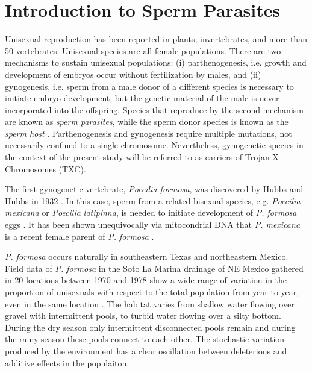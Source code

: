	\section{Introduction to Sperm Parasites}
	Unisexual reproduction has been reported in plants, invertebrates, and more than 50 vertebrates. Unisexual species are all-female populations. There are two mechanisms to sustain unisexual populations: (i) parthenogenesis, i.e. growth and development of embryos occur without fertilization by males, and (ii) gynogenesis, i.e. sperm from a male donor of a different species is necessary to initiate embryo development, but the genetic material of the male is never incorporated into the offspring. Species that reproduce by the second mechanism are known as \textit{sperm parasites}, while the sperm donor species is known as the \textit{sperm host} \cite{Kokko:persist}. Parthenogenesis and gynogenesis require multiple mutations, not necessarily confined to a single chromosome. Nevertheless, gynogenetic species in the context of the present study will be referred to as carriers of Trojan X Chromosomes (TXC). 
	
	The first gynogenetic vertebrate, \textit{Poecilia formosa}, was discovered by Hubbs and Hubbs in 1932 \cite{Wetherington:Poeciliopsis}. In this case, sperm from a related bisexual species, e.g. \textit{Poecilia mexicana} or \textit{Poecilia latipinna}, is needed to initiate development of \textit{P. formosa} eggs \cite{Balsano:Poecilia}.  It has been shown unequivocally via mitocondrial DNA that \textit{P. mexicana} is a recent female parent of \textit{P. formosa} \cite{Avise:Formosa}.    
	
	\textit{P. formosa} occurs naturally in southeastern Texas and northeastern Mexico. Field data of \textit{P. formosa} in the Soto La Marina drainage of NE Mexico gathered in 20 locations between 1970 and 1978 show a wide range of variation in the proportion of unisexuals with respect to the total population from year to year, even in the same location \cite{Balsano:Poecilia}.  The habitat varies from shallow water flowing over gravel with intermittent pools,  to turbid water flowing over a silty bottom. During the dry season only intermittent disconnected pools remain and during the rainy season these pools connect to each other. The stochastic variation produced by the environment has a clear oscillation between deleterious and additive effects in the populaiton.
	
